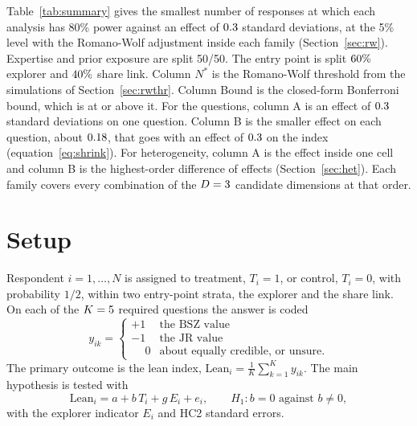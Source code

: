 \documentclass[11pt]{article}
\begin{document}
Table~\ref{tab:summary} gives the smallest number of responses at which each analysis has 80\%
power against an effect of $\DSum$ standard deviations, at the 5\% level with the Romano-Wolf
adjustment inside each family (Section~\ref{sec:rw}). Expertise and prior exposure are split
50/50. The entry point is split $60\%$ explorer and $40\%$ share link. Column $N^{*}$ is
the Romano-Wolf threshold from the simulations of Section~\ref{sec:rwthr}. Column Bound is the
closed-form Bonferroni bound, which is at or above it. For the \KWord{} questions, column A is an effect of
$\DSum$ standard deviations on one question. Column B is the smaller effect on each question,
about $0.18$, that goes with an effect of $\DSum$ on the index (equation~\eqref{eq:shrink}). For
heterogeneity, column A is the effect inside one cell and column B is the highest-order difference
of effects (Section~\ref{sec:het}). Each family covers every combination of the $D = 3$
candidate dimensions at that order.

\begin{table}[H]
  \centering
  \small
  
  \caption{Responses needed for 80\% power against an effect of $\DSum$ standard deviations,
  with the shares of Section~\ref{sec:sim}. $N^{*}$: the simulated Romano-Wolf threshold, rounded up to the next $\RoundTo$.
  Bound: the Bonferroni bound from equations~\eqref{eq:nstar}, \eqref{eq:shrink}
  and~\eqref{eq:nstar-het}. A single test ($m = 1$) needs no adjustment, so its $N^{*}$ comes from
  the formula. $^{\dagger}$The simulation found no Romano-Wolf threshold below the bound, so the
  bound is kept.}
  \label{tab:summary}
\end{table}

\section{Setup}

Respondent $i = 1, \dots, N$ is assigned to treatment, $T_i = 1$, or control, $T_i = 0$, with
probability $1/2$, within two entry-point strata, the explorer and the share link. On each of the $K = 5$ required questions the
answer is coded
\[
  y_{ik} = \begin{cases} +1 & \text{the BSZ value} \\ -1 & \text{the JR value} \\ \phantom{+}0 & \text{about equally credible, or unsure.} \end{cases}
\]
The primary outcome is the lean index, $\mathrm{Lean}_i = \frac{1}{K} \sum_{k=1}^{K} y_{ik}$. The
main hypothesis is tested with
\begin{equation}
  \mathrm{Lean}_i = a + b\,T_i + g\,E_i + e_i,
  \qquad H_1\colon b = 0 \text{ against } b \neq 0, \label{eq:main}
\end{equation}
with the explorer indicator $E_i$ and HC2 standard errors.
\end{document}
